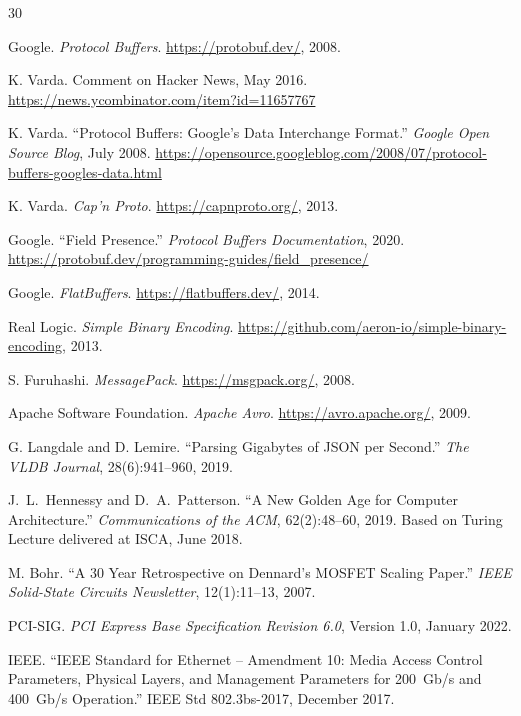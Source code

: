 \documentclass[10pt,onecolumn]{article}
\begin{document}
\begin{thebibliography}{30}


Google. \textit{Protocol Buffers}. \url{https://protobuf.dev/}, 2008.

K. Varda. Comment on Hacker News, May 2016. \url{https://news.ycombinator.com/item?id=11657767}

K. Varda. ``Protocol Buffers: Google's Data Interchange Format.'' \textit{Google Open Source Blog}, July 2008. \url{https://opensource.googleblog.com/2008/07/protocol-buffers-googles-data.html}

K. Varda. \textit{Cap'n Proto}. \url{https://capnproto.org/}, 2013.

Google. ``Field Presence.'' \textit{Protocol Buffers Documentation}, 2020. \url{https://protobuf.dev/programming-guides/field_presence/}

Google. \textit{FlatBuffers}. \url{https://flatbuffers.dev/}, 2014.

Real Logic. \textit{Simple Binary Encoding}. \url{https://github.com/aeron-io/simple-binary-encoding}, 2013.

S. Furuhashi. \textit{MessagePack}. \url{https://msgpack.org/}, 2008.

Apache Software Foundation. \textit{Apache Avro}. \url{https://avro.apache.org/}, 2009.

G. Langdale and D. Lemire. ``Parsing Gigabytes of JSON per Second.'' \textit{The VLDB Journal}, 28(6):941--960, 2019.


J.~L.~Hennessy and D.~A.~Patterson. ``A New Golden Age for Computer Architecture.'' \textit{Communications of the ACM}, 62(2):48--60, 2019. Based on Turing Lecture delivered at ISCA, June 2018.

M. Bohr. ``A 30 Year Retrospective on Dennard's MOSFET Scaling Paper.'' \textit{IEEE Solid-State Circuits Newsletter}, 12(1):11--13, 2007.

PCI-SIG. \textit{PCI Express Base Specification Revision 6.0}, Version 1.0, January 2022.

IEEE. ``IEEE Standard for Ethernet -- Amendment 10: Media Access Control Parameters, Physical Layers, and Management Parameters for 200~Gb/s and 400~Gb/s Operation.'' IEEE Std 802.3bs-2017, December 2017.


\end{thebibliography}
\end{document}
